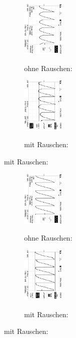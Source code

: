 \begin{figure}
\caption{$U_{out} (\phi = 135°$)}
\begin{subfigure}{0.48\textwidth}
\centering
\caption*{ohne Rauschen:}
\includegraphics[angle=90,height=2.6cm]{graphics/ALL0032/F0032TEK.jpg}
\label{fig:phi135o}
\end{subfigure}
\begin{subfigure}{0.48\textwidth}
\centering
\caption*{mit Rauschen:}
\includegraphics[angle=90,height=2.6cm]{graphics/ALL0040/F0040TEK.jpg}
\label{fig:phi135m}
\end{subfigure}
\end{figure}
\addtocounter{figure}{-1}
\begin{figure}
\caption{$U_{out} (\phi = 90°$) }
\begin{subfigure}{0.48\textwidth}
\centering
\caption*{ohne Rauschen:}
\includegraphics[angle=90,height=2.6cm]{graphics/ALL0033/F0033TEK.jpg}
\label{fig:phi90o}
\end{subfigure}
\begin{subfigure}{0.48\textwidth}
\centering
\caption*{mit Rauschen:}
\includegraphics[angle=90,height=2.6cm]{graphics/ALL0041/F0041TEK.jpg}
\label{fig:phi90m}
\end{subfigure}
\end{figure}
\addtocounter{figure}{-1}
